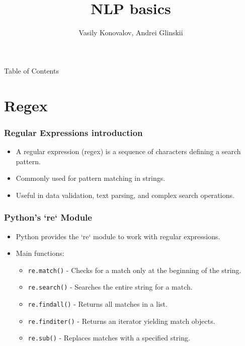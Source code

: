 \documentclass{beamer}
\title{NLP basics}
\author{Vasily Konovalov, Andrei Glinskii}
\date{}
\begin{document}
\frame[plain]{\titlepage}

\begin{frame}{Table of Contents}
    \tableofcontents
\end{frame}

\section{Regex}

\begin{frame}
    \frametitle{Regular Expressions introduction}
    \begin{itemize}
        \item A regular expression (regex) is a sequence of characters defining a search pattern.
        \item Commonly used for pattern matching in strings.
        \item Useful in data validation, text parsing, and complex search operations.
    \end{itemize}
\end{frame}

\begin{frame}
    \frametitle{Python's `re` Module}
    \begin{itemize}
        \item Python provides the `re` module to work with regular expressions.
        \item Main functions:
        \begin{itemize}
            \item \texttt{re.match()} - Checks for a match only at the beginning of the string.
            \item \texttt{re.search()} - Searches the entire string for a match.
            \item \texttt{re.findall()} - Returns all matches in a list.
            \item \texttt{re.finditer()} - Returns an iterator yielding match objects.
            \item \texttt{re.sub()} - Replaces matches with a specified string.
        \end{itemize}
    \end{itemize}
\end{frame}
\end{document}
